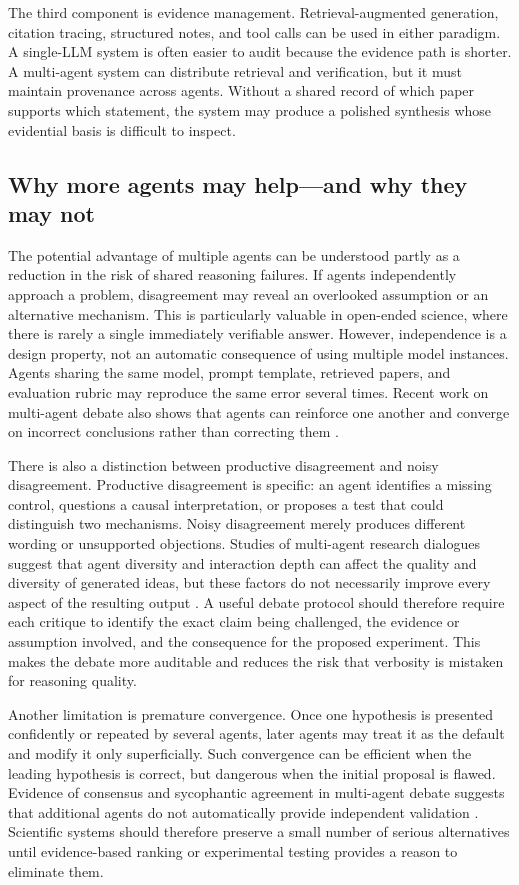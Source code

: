 \documentclass[11pt]{article}
\begin{document}
The third component is evidence management. Retrieval-augmented generation, citation tracing,
structured notes, and tool calls can be used in either paradigm. A single-LLM system is often easier
to audit because the evidence path is shorter. A multi-agent system can distribute retrieval and
verification, but it must maintain provenance across agents. Without a shared record of which paper
supports which statement, the system may produce a polished synthesis whose evidential basis is
difficult to inspect.

\subsection{Why more agents may help---and why they may not}
\label{subsec:more-agents}

The potential advantage of multiple agents can be understood partly as a reduction in the risk of
shared reasoning failures. If agents independently approach a problem, disagreement may reveal an
overlooked assumption or an alternative mechanism. This is particularly valuable in open-ended
science, where there is rarely a single immediately verifiable answer. However, independence is a
design property, not an automatic consequence of using multiple model instances. Agents sharing the
same model, prompt template, retrieved papers, and evaluation rubric may reproduce the same error
several times. Recent work on multi-agent debate also shows that agents can reinforce one another
and converge on incorrect conclusions rather than correcting them \cite{choi2025debatevote}.

There is also a distinction between productive disagreement and noisy disagreement. Productive
disagreement is specific: an agent identifies a missing control, questions a causal interpretation,
or proposes a test that could distinguish two mechanisms. Noisy disagreement merely produces
different wording or unsupported objections. Studies of multi-agent research dialogues suggest that
agent diversity and interaction depth can affect the quality and diversity of generated ideas, but
these factors do not necessarily improve every aspect of the resulting output
\cite{ueda2025design}. A useful debate protocol should therefore require each critique to identify
the exact claim being challenged, the evidence or assumption involved, and the consequence for the
proposed experiment. This makes the debate more auditable and reduces the risk that verbosity is
mistaken for reasoning quality.

Another limitation is premature convergence. Once one hypothesis is presented confidently or
repeated by several agents, later agents may treat it as the default and modify it only superficially.
Such convergence can be efficient when the leading hypothesis is correct, but dangerous when the
initial proposal is flawed. Evidence of consensus and sycophantic agreement in multi-agent debate
suggests that additional agents do not automatically provide independent validation
\cite{choi2025debatevote}. Scientific systems should therefore preserve a small number of serious
alternatives until evidence-based ranking or experimental testing provides a reason to eliminate
them.
\end{document}
